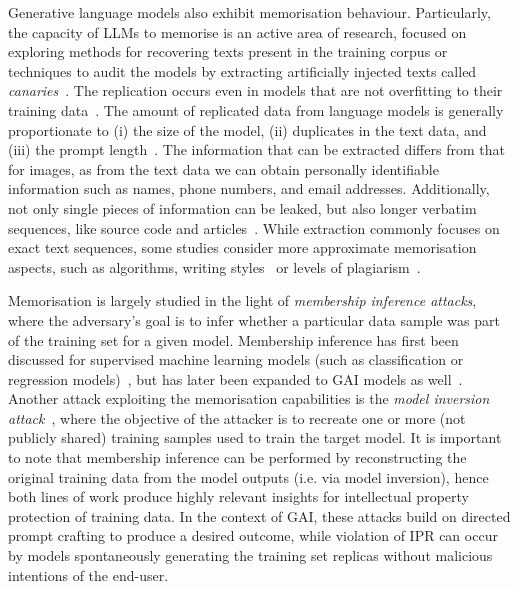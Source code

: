 \documentclass[conference,table]{IEEEtran}
\begin{document}
Generative language models also exhibit memorisation behaviour. Particularly, the capacity of LLMs to memorise is an active area of research, focused on exploring methods for recovering texts present in the training corpus or techniques to audit the models by extracting artificially injected texts called \textit{canaries}~\cite{carlini_secret_2019}. The replication occurs even in models that are not overfitting to their training data~\cite{tirumala_memorization_2022,jagielski_measuring_2023}. 
The amount of replicated data from language models is generally proportionate to (i) the size of the model, (ii) duplicates in the text data, and (iii) the prompt length~\cite{carlini_quantifying_2023,carlini_extracting_2021}. The information that can be extracted differs from that for images, as from the text data we can obtain personally identifiable information such as names, phone numbers, and email addresses. Additionally, not only single pieces of information can be leaked, but also longer verbatim sequences, like source code and articles~\cite{carlini_extracting_2021}. While extraction commonly focuses on exact text sequences, some studies consider more approximate memorisation aspects, such as algorithms, writing styles~\cite{hartmann_sok_2023} or levels of plagiarism~\cite{lee_language_2023}.



Memorisation is largely studied in the light of \textit{membership inference attacks}, where the adversary's goal is to infer whether a particular data sample was part of the training set for a given model. Membership inference has first been discussed for supervised machine learning models (such as classification or regression models)~\cite{shokri_membership_2017}, but has later been expanded to GAI models as well~\cite{webster_this_2021,hu_membership_2023,matsumoto_membership_2023}.
Another attack exploiting the memorisation capabilities is the \textit{model inversion attack}~\cite{fredrikson_model_2015}, where the objective of the attacker is to recreate one or more (not publicly shared) training samples used to train the target model\cite{yin_dreaming_2020,ghiasi_plug-inversion_2022,carlini_extracting_2023}. 
It is important to note that membership inference can be performed by reconstructing the original training data from the model outputs (i.e. via model inversion), hence both lines of work produce highly relevant insights for intellectual property protection of training data.
In the context of GAI, these attacks build on directed prompt crafting to produce a desired outcome, while violation of IPR can occur by models spontaneously generating the training set replicas without malicious intentions of the end-user.
\end{document}
